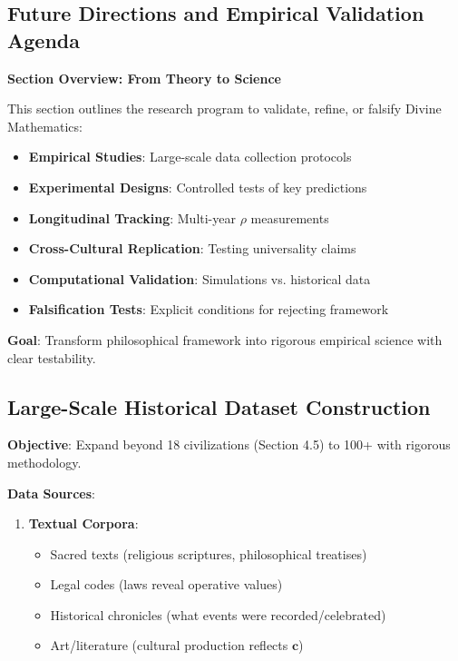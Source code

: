 \documentclass[11pt,a4paper]{article}
\theoremstyle{definition}
\theoremstyle{remark}
\newcommand{\cc}{\mathbf{c}}
\begin{document}
\begin{enumerate}
\section{Future Directions and Empirical Validation Agenda}

\begin{mdframed}[backgroundcolor=cyan!5,linewidth=2pt]
\textbf{Section Overview: From Theory to Science}

This section outlines the research program to validate, refine, or falsify Divine Mathematics:

\begin{itemize}[nosep]
    \item \textbf{Empirical Studies}: Large-scale data collection protocols
    \item \textbf{Experimental Designs}: Controlled tests of key predictions
    \item \textbf{Longitudinal Tracking}: Multi-year \(\rho\) measurements
    \item \textbf{Cross-Cultural Replication}: Testing universality claims
    \item \textbf{Computational Validation}: Simulations vs. historical data
    \item \textbf{Falsification Tests}: Explicit conditions for rejecting framework
\end{itemize}

\textbf{Goal}: Transform philosophical framework into rigorous empirical science with clear testability.
\end{mdframed}

\subsection{Large-Scale Historical Dataset Construction}

\begin{protocol}
\textbf{Objective}: Expand beyond 18 civilizations (Section 4.5) to 100+ with rigorous methodology.

\textbf{Data Sources}:
\begin{enumerate}
    \item \textbf{Textual Corpora}:
        \begin{itemize}[nosep]
            \item Sacred texts (religious scriptures, philosophical treatises)
            \item Legal codes (laws reveal operative values)
            \item Historical chronicles (what events were recorded/celebrated)
            \item Art/literature (cultural production reflects \(\cc\))
        \end{itemize}
    

\end{enumerate}
\end{protocol}
\end{enumerate}
\end{document}
